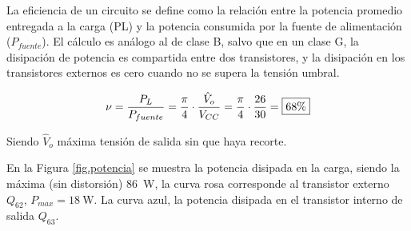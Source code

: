 
La eficiencia de un circuito se define como la relación entre la potencia promedio entregada a la carga (PL) y la potencia consumida por la fuente de alimentación ($P_{fuente}$). El cálculo es análogo al de clase B, salvo que en un clase G, la disipación de potencia es compartida entre dos transistores, y la disipación en los transistores externos es cero cuando no se supera la tensión umbral.

\begin{equation}
	\centering
	\nu = \frac{P_L}{P_{fuente}} = \frac{\pi}{4} \cdot \frac{\hat{V}_o}{V_{CC}} = \frac{\pi}{4} \cdot \frac{26}{30}= \boxed{68\%}
\end{equation}

Siendo $ \hat{V}_o$ máxima tensión de salida sin que haya recorte.


En la Figura \ref{fig.potencia} se muestra la potencia disipada en la carga, siendo la máxima (sin distorsión) \SI{86}{\watt}, la curva rosa corresponde al transistor externo $Q_{62}$, $P_{max} = \SI{18}{\watt}$. La curva azul, la potencia disipada en el transistor interno de salida $Q_{63}$.


